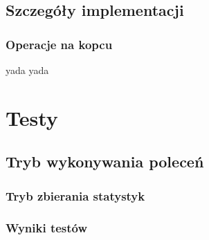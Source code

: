 \documentclass[12pt,a4paper]{article}
\begin{document}
\subsection{Szczegóły implementacji}

\subsubsection{Operacje na kopcu}

yada yada

\section{Testy}

\subsection{Tryb wykonywania poleceń}

\subsubsection{Tryb zbierania statystyk}

\subsubsection{Wyniki testów}
\end{document}

